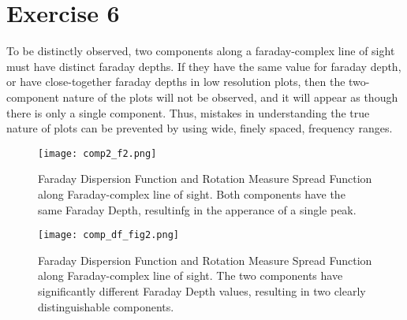 \documentclass{article}
\begin{document}
\section*{Exercise 6}
To be distinctly observed, two components along a faraday-complex line of sight must have distinct faraday depths. If they have the same value for faraday depth, or have close-together faraday depths in low resolution plots, then the two-component nature of the plots will not be observed, and it will appear as though there is only a single component. Thus, mistakes in understanding the true nature of plots can be prevented by using wide, finely spaced, frequency ranges.

\begin{figure}[hbt!]
\centering
\texttt{[image: comp2\_f2.png]}
\label{fig:rel_err}
\caption{Faraday Dispersion Function and Rotation Measure Spread Function along Faraday-complex line of sight. Both components have the same Faraday Depth, resultinfg in the apperance of a single peak.}
\end{figure}

\begin{figure}[hbt!]
\centering
\texttt{[image: comp\_df\_fig2.png]}
\label{fig:rel_err}
\caption{Faraday Dispersion Function and Rotation Measure Spread Function along Faraday-complex line of sight. The two components have significantly different Faraday Depth values, resulting in two clearly distinguishable components.}
\end{figure}
\end{document}
